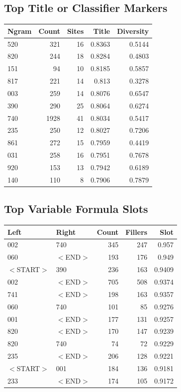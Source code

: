 \documentclass[11pt,a4paper]{article}
\begin{document}
\subsection*{Top Title or Classifier Markers}
\begin{center}
\begin{tabular}{lrrrr}
\toprule
\textbf{Ngram} & \textbf{Count} & \textbf{Sites} & \textbf{Title} & \textbf{Diversity} \\
\midrule
520 & 321 & 16 & 0.8363 & 0.5144 \\
820 & 244 & 18 & 0.8284 & 0.4803 \\
151 & 94 & 10 & 0.8185 & 0.5857 \\
817 & 221 & 14 & 0.813 & 0.3278 \\
003 & 259 & 14 & 0.8076 & 0.6547 \\
390 & 290 & 25 & 0.8064 & 0.6274 \\
740 & 1928 & 41 & 0.8034 & 0.5417 \\
235 & 250 & 12 & 0.8027 & 0.7206 \\
861 & 272 & 15 & 0.7959 & 0.4419 \\
031 & 258 & 16 & 0.7951 & 0.7678 \\
920 & 153 & 13 & 0.7942 & 0.6189 \\
140 & 110 & 8 & 0.7906 & 0.7879 \\
\bottomrule
\end{tabular}
\end{center}
\subsection*{Top Variable Formula Slots}
\begin{center}
\begin{tabular}{llrrr}
\toprule
\textbf{Left} & \textbf{Right} & \textbf{Count} & \textbf{Fillers} & \textbf{Slot} \\
\midrule
002 & 740 & 345 & 247 & 0.957 \\
060 & $<$END$>$ & 193 & 176 & 0.949 \\
$<$START$>$ & 390 & 236 & 163 & 0.9409 \\
002 & $<$END$>$ & 705 & 508 & 0.9374 \\
741 & $<$END$>$ & 198 & 163 & 0.9357 \\
060 & 740 & 101 & 85 & 0.9276 \\
001 & $<$END$>$ & 177 & 131 & 0.9257 \\
820 & $<$END$>$ & 170 & 147 & 0.9239 \\
820 & 740 & 74 & 72 & 0.9229 \\
235 & $<$END$>$ & 206 & 128 & 0.9221 \\
$<$START$>$ & 001 & 184 & 136 & 0.9181 \\
233 & $<$END$>$ & 174 & 105 & 0.9172 \\
\bottomrule
\end{tabular}
\end{center}
\end{document}
